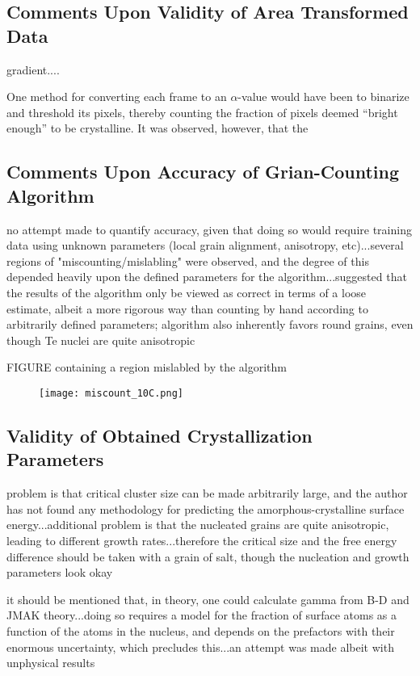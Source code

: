 \subsection{Comments Upon Validity of Area Transformed Data}

gradient....

One method for converting each frame to an $\alpha$-value would have been to binarize and threshold its pixels, thereby counting the fraction of pixels deemed ``bright enough'' to be crystalline.  It was observed, however, that the 

\subsection{Comments Upon Accuracy of Grian-Counting Algorithm}

no attempt made to quantify accuracy, given that doing so would require training data using unknown parameters (local grain alignment, anisotropy, etc)...several regions of "miscounting/mislabling" were observed, and the degree of this depended heavily upon the defined parameters for the algorithm...suggested that the results of the algorithm only be viewed as correct in terms of a loose estimate, albeit a more rigorous way than counting by hand according to arbitrarily defined parameters; algorithm also inherently favors round grains, even though Te nuclei are quite anisotropic

FIGURE containing a region mislabled by the algorithm

	\begin{figure}[h]
		\centering
		\texttt{[image: miscount\_10C.png]}
		\caption{}
		\label{fig:miscount}
	\end{figure}

\subsection{Validity of Obtained Crystallization Parameters}

problem is that critical cluster size can be made arbitrarily large, and the author has not found any methodology for predicting the amorphous-crystalline surface energy...additional problem is that the nucleated grains are quite anisotropic, leading to different growth rates...therefore the critical size and the free energy difference should be taken with a grain of salt, though the nucleation and growth parameters look okay

it should be mentioned that, in theory, one could calculate gamma from B-D and JMAK theory...doing so requires a model for the fraction of surface atoms as a function of the atoms in the nucleus, and depends on the prefactors with their enormous uncertainty, which precludes this...an attempt was made albeit with unphysical results

